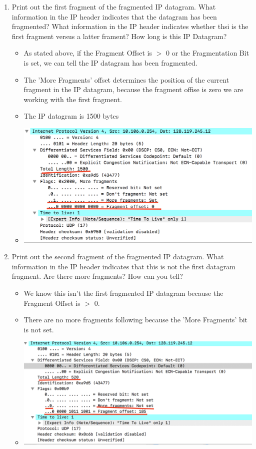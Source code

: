 \documentclass{article}
\begin{document}
\begin{enumerate}
      \item Print out the first fragment of the fragmented IP datagram.  What information in the IP header indicates that the datagram has been fragmented?  What information in the IP header indicates whether thsi is the first fragment
      versus a latter frament?  How long is this IP Datagram?
          \begin{itemize}
            \item As stated above, if the Fragment Offset is $>$ 0 or the Fragmentation Bit is set, we can tell the IP datagram has been fragmented.
            \item The 'More Fragments' offset determines the position of the current fragment in the IP datagram, because the fragment offise is zero we are working with the first fragment.
            \item The IP datagram is 1500 bytes
            \item \includegraphics[scale=0.5]{images/IP11.png}

          \end{itemize}

      \item Print out the second fragment of the fragmented IP datagram.  What information in the IP header indicates that this is not the first datagram fragment.  Are there more fragments?  How can you tell?
        \begin{itemize}
          \item We know this isn't the first fragmented IP datagram because the Fragment Offset is $>$ 0.
          \item There are no more fragments following because the 'More Fragments' bit is not set.
          \item \includegraphics[scale=0.5]{images/IP12.png}
        \end{itemize}


\end{enumerate}
\end{document}
